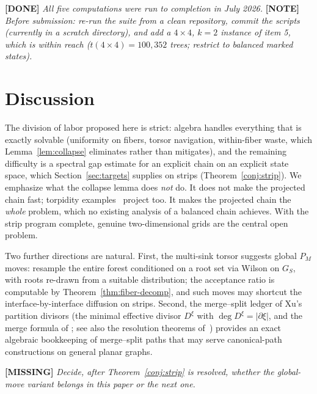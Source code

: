 \documentclass[11pt]{article}
\newcommand{\done}[1]{\medskip\noindent\textcolor{donecol}{\textbf{[DONE]} \emph{#1}}\medskip}
\newcommand{\missing}[1]{\medskip\noindent\textcolor{misscol}{\textbf{[MISSING]} \emph{#1}}\medskip}
\newcommand{\statusnote}[1]{\medskip\noindent\textcolor{notecol}{\textbf{[NOTE]} \emph{#1}}\medskip}
\begin{document}
\done{All five computations were run to completion in July 2026.}
\statusnote{Before submission: re-run the suite from a clean repository,
commit the scripts (currently in a scratch directory), and add a $4 \times
4$, $k = 2$ instance of item 5, which is within reach ($t(4\times 4)
= 100{,}352$ trees; restrict to balanced marked states).}

\section{Discussion}

The division of labor proposed here is strict: algebra handles everything
that is exactly solvable (uniformity on fibers, torsor navigation,
within-fiber waste, which Lemma~\ref{lem:collapse} eliminates rather than
mitigates), and the remaining difficulty is a spectral gap estimate for an
explicit chain on an explicit state space, which
Section~\ref{sec:targets} supplies on strips
(Theorem~\ref{conj:strip}). We emphasize what the collapse lemma does
\emph{not} do. It does not make the projected chain fast; torpidity
examples~\cite{charikar2023complexity} project too. It makes the projected
chain the \emph{whole} problem, which no existing analysis of a balanced
chain achieves. With the strip program complete, genuine two-dimensional
grids are the central open problem.

Two further directions are natural. First, the multi-sink torsor suggests
global $P_M$ moves: resample the entire forest conditioned on a root set
via Wilson on $G_S$, with roots re-drawn from a suitable distribution; the
acceptance ratio is computable by Theorem~\ref{thm:fiber-decomp}, and such
moves may shortcut the interface-by-interface diffusion on strips. Second,
the merge--split ledger of Xu's partition divisors (the minimal effective
divisor $D^\xi$ with $\deg D^\xi = |\partial \xi|$, and the merge formula
of \cite[Cor.~3]{xu2011partitions}; see also the resolution theorems
of~\cite{manjunath2015minimal, mohammadi2014divisors}) provides an exact
algebraic bookkeeping of merge--split paths that may serve canonical-path
constructions on general planar graphs.

\missing{Decide, after Theorem~\ref{conj:strip} is resolved, whether the
global-move variant belongs in this paper or the next one.}

\appendix
\end{document}
